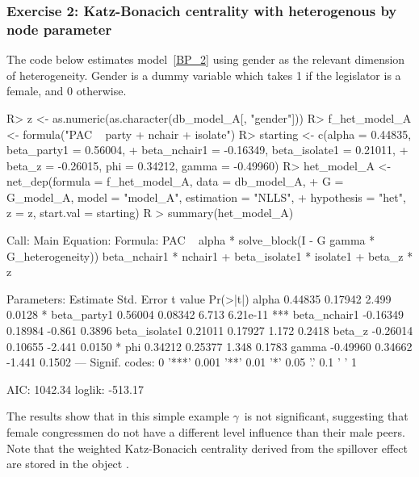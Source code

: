 \documentclass[nojss]{jss}
\begin{document}
\subsubsection{Exercise 2: Katz-Bonacich centrality with heterogenous by node parameter}

The code below estimates model~\ref{BP_2} using gender as the
relevant dimension of heterogeneity. Gender is a dummy variable
which takes 1 if the legislator is a female, and 0 otherwise. 
\begin{CodeChunk}
\begin{CodeInput}
R> z <- as.numeric(as.character(db_model_A[, "gender"]))
R> f_het_model_A <- formula("PAC ~ party + nchair + isolate")
R> starting <- c(alpha = 0.44835, beta_party1 = 0.56004,
+    beta_nchair1 = -0.16349, beta_isolate1 = 0.21011,
+    beta_z = -0.26015, phi = 0.34212, gamma = -0.49960)
R> het_model_A <- net_dep(formula = f_het_model_A, data = db_model_A,
+    G = G_model_A, model = "model_A", estimation = "NLLS",
+    hypothesis = "het", z = z, start.val = starting)
R > summary(het_model_A)
\end{CodeInput}
\begin{CodeOutput}
Call:
Main Equation:  
Formula: PAC ~ alpha * solve_block(I - G %
gamma * G_heterogeneity)) %
beta_nchair1 * nchair1 + beta_isolate1 * isolate1 + beta_z * z

Parameters:
Estimate Std. Error t value Pr(>|t|)    
alpha          0.44835    0.17942   2.499   0.0128 *  
beta_party1    0.56004    0.08342   6.713 6.21e-11 ***
beta_nchair1  -0.16349    0.18984  -0.861   0.3896    
beta_isolate1  0.21011    0.17927   1.172   0.2418    
beta_z        -0.26014    0.10655  -2.441   0.0150 *  
phi            0.34212    0.25377   1.348   0.1783    
gamma         -0.49960    0.34662  -1.441   0.1502    
---
Signif. codes:  0 '***' 0.001 '**' 0.01 '*' 0.05 '.' 0.1 ' ' 1

AIC: 1042.34  loglik: -513.17
\end{CodeOutput}
\end{CodeChunk}
The results show that in this simple example $\gamma$\ is not significant, suggesting that female congressmen do not have a different level influence than their male peers. Note that the weighted Katz-Bonacich centrality derived from the spillover effect are stored in the object .
\end{document}
